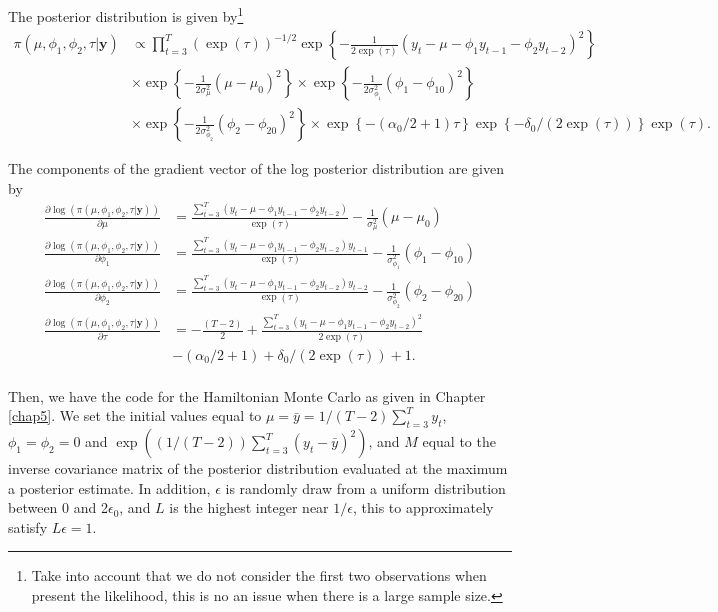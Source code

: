 The posterior distribution is given by\footnote{Take into account that we do not consider the first two observations when present the likelihood, this is no an issue when there is a large sample size.}
\begin{align*}
	\pi(\mu,\phi_1,\phi_2,\tau|\bm{y})&\propto \prod_{t=3}^T(\exp(\tau))^{-1/2}\exp\left\{-\frac{1}{2\exp(\tau)}(y_t-\mu-\phi_1y_{t-1}-\phi_2y_{t-2})^2\right\}\\
	&\times\exp\left\{-\frac{1}{2\sigma^2_{\mu}}(\mu-\mu_0)^2\right\}\times\exp\left\{-\frac{1}{2\sigma^2_{\phi_1}}(\phi_1-\phi_{10})^2\right\}\\
	&\times\exp\left\{-\frac{1}{2\sigma^2_{\phi_2}}(\phi_2-\phi_{20})^2\right\}\times\exp\left\{-(\alpha_0/2+1)\tau\right\}\exp\left\{-\delta_0/(2\exp(\tau))\right\}\exp(\tau).
\end{align*} 

The components of the gradient vector of the log posterior distribution are given by
\begin{align*}
	\frac{\partial \log(\pi(\mu,\phi_1,\phi_2,\tau|\bm{y}))}{\partial\mu}&=\frac{\sum_{t=3}^T(y_t-\mu-\phi_1y_{t-1}-\phi_2y_{t-2})}{\exp(\tau)}-\frac{1}{\sigma_{\mu}^2}(\mu-\mu_0)\\
	\frac{\partial\log(\pi(\mu,\phi_1,\phi_2,\tau|\bm{y}))}{\partial\phi_1}&=\frac{\sum_{t=3}^T(y_t-\mu-\phi_1y_{t-1}-\phi_2y_{t-2})y_{t-1}}{\exp(\tau)}-\frac{1}{\sigma_{\phi_1}^2}(\phi_1-\phi_{10})\\
	\frac{\partial\log(\pi(\mu,\phi_1,\phi_2,\tau|\bm{y}))}{\partial\phi_2}&=\frac{\sum_{t=3}^T(y_t-\mu-\phi_1y_{t-1}-\phi_2y_{t-2})y_{t-2}}{\exp(\tau)}-\frac{1}{\sigma_{\phi_2}^2}(\phi_2-\phi_{20})\\	\frac{\partial\log(\pi(\mu,\phi_1,\phi_2,\tau|\bm{y}))}{\partial\tau}&=-\frac{(T-2)}{2}+\frac{\sum_{t=3}^T(y_t-\mu-\phi_1y_{t-1}-\phi_2y_{t-2})^2}{2\exp(\tau)}\\
	&-(\alpha_0/2+1)+\delta_0/(2\exp(\tau))+1.\\
\end{align*}

Then, we have the code for the Hamiltonian Monte Carlo as given in Chapter \ref{chap5}. We set the initial values equal to $\mu=\bar{y}=1/(T-2)\sum_{t=3}^T y_t$, $\phi_1=\phi_2=0$ and $\exp((1/(T-2))\sum_{t=3}^T(y_t-\bar{y})^2)$, and $M$ equal to the inverse covariance matrix of the posterior distribution evaluated at the maximum a posterior estimate. In addition, $\epsilon$ is randomly draw from a uniform distribution between 0 and 2$\epsilon_0$, and $L$ is the highest integer near $1/\epsilon$, this to approximately satisfy $L\epsilon=1$. 

